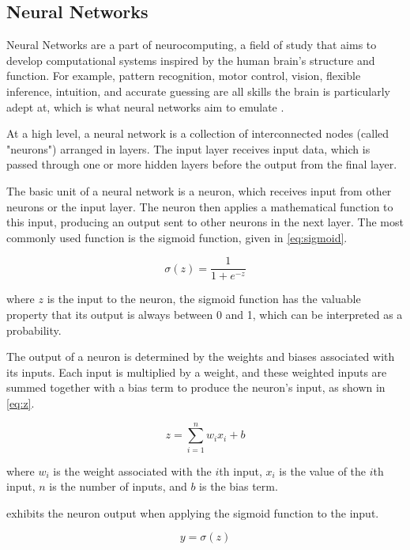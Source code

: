 \subsection{Neural Networks}\label{neuralnet}
Neural Networks are a part of neurocomputing, a field of study that aims to develop computational systems inspired by the human brain's structure and function. For example, pattern recognition, motor control, vision, flexible inference, intuition, and accurate guessing are all skills the brain is particularly adept at, which is what neural networks aim to emulate \autocite{anderson1995introduction}. 

At a high level, a neural network is a collection of interconnected nodes (called "neurons") arranged in layers. The input layer receives input data, which is passed through one or more hidden layers before the output from the final layer.

The basic unit of a neural network is a neuron, which receives input from other neurons or the input layer. The neuron then applies a mathematical function to this input, producing an output sent to other neurons in the next layer. The most commonly used function is the sigmoid function, given in \cref{eq:sigmoid}. 

\begin{equation}
    \sigma(z) = \frac{1}{1+e^{-z}}
    \label{eq:sigmoid}
\end{equation}

where $z$ is the input to the neuron, the sigmoid function has the valuable property that its output is always between 0 and 1, which can be interpreted as a probability.

The output of a neuron is determined by the weights and biases associated with its inputs. Each input is multiplied by a weight, and these weighted inputs are summed together with a bias term to produce the neuron's input, as shown in \cref{eq:z}. 

\begin{equation}
    z = \sum_{i=1}^n w_i x_i + b
    \label{eq:z}
\end{equation}

where $w_i$ is the weight associated with the $i$th input, $x_i$ is the value of the $i$th input, $n$ is the number of inputs, and $b$ is the bias term.

 exhibits the neuron output when applying the sigmoid function to the input.

\begin{equation}
    y = \sigma(z)
    \label{eq:y}
\end{equation}

